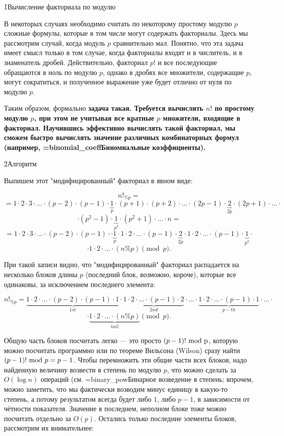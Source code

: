 \h1{Вычисление факториала по модулю}

В некоторых случаях необходимо считать по некоторому простому модулю $p$ сложные формулы, которые в том числе могут содержать факториалы. Здесь мы рассмотрим случай, когда модуль $p$ сравнительно мал. Понятно, что эта задача имеет смысл только в том случае, когда факториалы входят и в числитель, и в знаменатель дробей. Действительно, факториал $p!$ и все последующие обращаются в ноль по модулю $p$, однако в дробях все множители, содержащие $p$, могут сократиться, и полученное выражение уже будет отлично от нуля по модулю $p$.

Таким образом, формально \bf{задача} такая. Требуется вычислить $n!$ по простому модулю $p$, при этом не учитывая все кратные $p$ множители, входящие в факториал. Научившись эффективно вычислять такой факториал, мы сможем быстро вычислять значение различных комбинаторных формул (например, \algohref=binomial_coeff{Биномиальные коэффициенты}).


\h2{Алгоритм}

Выпишем этот "модифицированный" факториал в явном виде:

$$ n!_{\%p} = $$
$$ = 1 \cdot 2 \cdot 3 \cdot \ldots \cdot (p-2) \cdot (p-1) \cdot \underbrace{1}_{p} \cdot (p+1) \cdot (p+2) \cdot \ldots \cdot (2p-1) \cdot \underbrace{2}_{2p} \cdot (2p+1) \cdot \ldots \cdot $$
$$ \cdot (p^2-1) \cdot \underbrace{1}_{p^2} \cdot (p^2+1) \cdot \ldots \cdot n = $$
$$ = 1 \cdot 2 \cdot 3 \cdot \ldots \cdot (p-2) \cdot (p-1) \cdot \cdot \underbrace{1}_{p} \cdot 1 \cdot 2 \cdot \ldots \cdot (p-1) \cdot \underbrace{2}_{2p} \cdot 1 \cdot 2 \cdot \ldots \cdot (p-1) \cdot \underbrace{1}_{p^2} \cdot $$
$$ \cdot 1 \cdot 2 \cdot \ldots \cdot (n\%p) \pmod p. $$

При такой записи видно, что "модифицированный" факториал распадается на несколько блоков длины $p$ (последний блок, возможно, короче), которые все одинаковы, за исключением последнего элемента:

$$ n!_{\%p} = \underbrace{ 1 \cdot 2 \cdot \ldots \cdot (p-2) \cdot (p-1) \cdot 1}_{1st} \cdot \underbrace{ 1 \cdot 2 \cdot \ldots \cdot (p-1) \cdot 2 }_{2nd} \cdot \ldots \cdot \underbrace{ 1 \cdot 2 \cdot \ldots \cdot (p-1) \cdot 1 }_{p-th} \cdot \ldots \cdot $$
$$ \cdot \underbrace{ 1 \cdot 2 \cdot \ldots \cdot (n\%p)}_{tail} \pmod p. $$

Общую часть блоков посчитать легко --- это просто $(p-1)!\ \rm{mod}\ p$, которую можно посчитать программно или по теореме Вильсона (Wilson) сразу найти $(p-1)!\ {\rm mod}\ p = p-1$. Чтобы перемножить эти общие части всех блоков, надо найденную величину возвести в степень по модулю $p$, что можно сделать за $O(\log n)$ операций (см. \algohref=binary_pow{Бинарное возведение в степень}; впрочем, можно заметить, что мы фактически возводим минус единицу в какую-то степень, а потому результатом всегда будет либо $1$, либо $p-1$, в зависимости от чётности показателя. Значение в последнем, неполном блоке тоже можно посчитать отдельно за $O(p)$. Остались только последние элементы блоков, рассмотрим их внимательнее:

